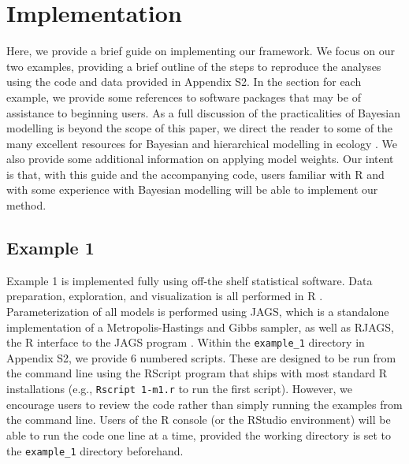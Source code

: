 \documentclass[11pt]{article}
\begin{document}
\section*{Implementation}
Here, we provide a brief guide on implementing our framework. We focus on our two examples, providing a brief outline of the steps to reproduce the analyses using the code and data provided in Appendix S2.
In the section for each example, we provide some references to software packages that may be of assistance to beginning users.
As a full discussion of the practicalities of Bayesian modelling is beyond the scope of this paper, we direct the reader to some of the many excellent resources for Bayesian and hierarchical modelling in ecology \citep[e.g., we suggest][]{Bolker2007, Royle2009, Link2010}.
We also provide some additional information on applying model weights.
Our intent is that, with this guide and the accompanying code, users familiar with R and with some experience with Bayesian modelling will be able to implement our method.

\subsection*{Example 1}
Example 1 is implemented fully using off-the shelf statistical software.
Data preparation, exploration, and visualization is all performed in R \citep{R}.
Parameterization of all models is performed using JAGS, which is a standalone implementation of a Metropolis-Hastings and Gibbs sampler, as well as RJAGS, the R interface to the JAGS program \citep{RJAGS}.
Within the {\tt example\_1} directory in Appendix S2, we provide 6 numbered scripts.
These are designed to be run from the command line using the RScript program that ships with most standard R installations (e.g., {\tt Rscript 1-m1.r} to run the first script).
However, we encourage users to review the code rather than simply running the examples from the command line.
Users of the R console (or the RStudio environment) will be able to run the code one line at a time, provided the working directory is set to the {\tt example\_1} directory beforehand.
\end{document}
